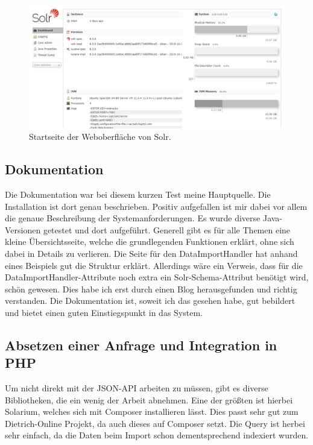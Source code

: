 \begin{figure}
	\centering
	\includegraphics[width=1\linewidth]{images/solr_interface.png}
	\caption{Startseite der Weboberfläche von Solr.}
	\label{img:solrInterface}
\end{figure}


\subsection{Dokumentation}

Die Dokumentation war bei diesem kurzen Test meine Hauptquelle. Die Installation ist dort genau beschrieben. Positiv aufgefallen ist mir dabei vor allem die genaue Beschreibung der Systemanforderungen. Es wurde diverse Java-Versionen getestet und dort aufgeführt. 
Generell gibt es für alle Themen eine kleine Übersichtsseite, welche die grundlegenden Funktionen erklärt, ohne sich dabei in Details zu verlieren. 
Die Seite für den DataImportHandler hat anhand eines Beispiels gut die Struktur erklärt. Allerdings wäre ein Verweis, dass für die DataImportHandler-Attribute noch extra ein Solr-Schema-Attribut benötigt wird, schön gewesen. Dies habe ich erst durch einen Blog \cite{IqubalMustafaKaki.2016} herausgefunden und richtig verstanden. 
Die Dokumentation ist, soweit ich das gesehen habe, gut bebildert und bietet einen guten Einstiegspunkt in das System.

\subsection{Absetzen einer Anfrage und Integration in PHP}

Um nicht direkt mit der JSON-API arbeiten zu müssen, gibt es diverse Bibliotheken, die ein wenig der Arbeit abnehmen. Eine der größten ist hierbei Solarium, welches sich mit Composer installieren lässt. Dies passt sehr gut zum Dietrich-Online Projekt, da auch dieses auf Composer setzt. 
Die Query ist herbei sehr einfach, da die Daten beim Import schon dementsprechend indexiert wurden.

